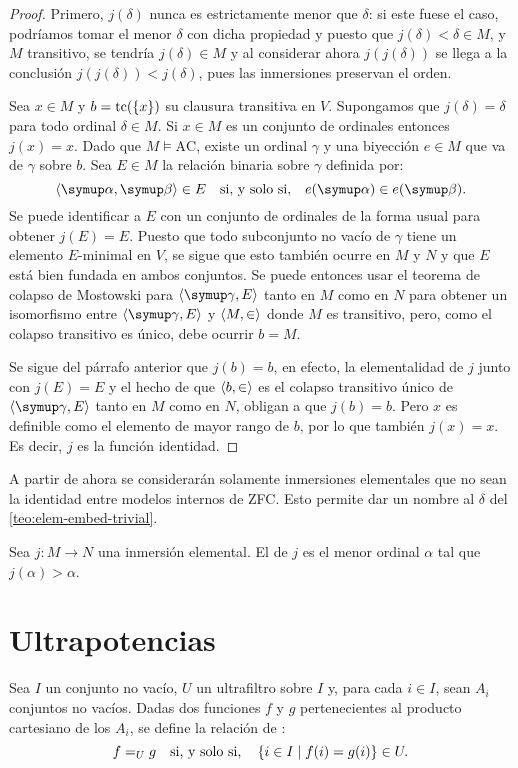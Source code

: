 \begin{proof}
    Primero, $j(\delta)$ nunca es estrictamente menor que $\delta$:
    si este fuese el caso, podríamos tomar el menor $\delta$ con dicha propiedad
    y puesto que $j(\delta) < \delta \in M$, y $M$ transitivo, se tendría
    $j(\delta)\in M$ y al considerar ahora $j(j(\delta))$ se llega a la conclusión
    $j(j(\delta)) < j(\delta)$, pues las inmersiones preservan el orden.

    Sea $x\in M$ y $b = \operatorname{tc}(\left\{ x \right\})$ su clausura transitiva en $V$.
    Supongamos que $j(\delta) = \delta$ para todo ordinal $\delta\in M$.
    Si $x\in M$ es un conjunto de ordinales entonces $j(x)=x$.
    Dado que $M\models \text{AC}$, existe un ordinal $\gamma$ y
    una biyección $e\in M$ que va de $\gamma$ sobre $b$.
    Sea $E\in M$ la relación binaria sobre $\gamma$ definida por:
    \[
        \op{\alpha, \beta}\in E\quad\text{si, y solo si,}\quad e(\alpha)\in e(\beta).
    \]
    Se puede identificar a $E$ con un conjunto de ordinales de la forma usual
    para obtener $j(E)=E$. Puesto que todo subconjunto no vacío de $\gamma$
    tiene un elemento $E$-minimal en $V$, se sigue que esto también ocurre en $M$ y $N$
    y que $E$ está bien fundada en ambos conjuntos.
    Se puede entonces usar el teorema de colapso de Mostowski para $\op{\gamma, E}$
    tanto en $M$ como en $N$ para obtener un isomorfismo entre $\op{\gamma, E}$
    y $\langle M,\in \rangle$ donde $M$ es transitivo, pero, como el colapso transitivo
    es único, debe ocurrir $b = M$.

    Se sigue del párrafo anterior que $j(b)=b$, en efecto,
    la elementalidad de $j$ junto con $j(E)=E$ y el hecho de que
    $\langle b,\in \rangle$ es el colapso transitivo único de $\op{\gamma, E}$
    tanto en $M$ como en $N$, obligan a que $j(b)=b$.
    Pero $x$ es definible como el elemento de mayor rango de $b$, por lo que también
    $j(x) = x$. Es decir, $j$ es la función identidad.
\end{proof}

A partir de ahora
se considerarán solamente inmersiones elementales que no sean la identidad
entre modelos internos de ZFC.
Esto permite dar un nombre al $\delta$ del \cref{teo:elem-embed-trivial}.

\begin{defi}
    Sea $j\colon M\to N$ una inmersión elemental. El  de $j$
    es el menor ordinal $\alpha$ tal que $j(\alpha)>\alpha$.
\end{defi}

\section{Ultrapotencias}
Sea $I$ un conjunto no vacío, $U$ un ultrafiltro sobre $I$ y, para cada $i\in I$,
sean $A_i$ conjuntos no vacíos. Dadas dos funciones $f$ y $g$ pertenecientes al producto
cartesiano de los $A_i$, se define la relación de :
\[
    f=_U g \quad\text{si, y solo si,}\quad \left\{ i\in I\mid f(i)=g(i) \right\}\in U.
\]

